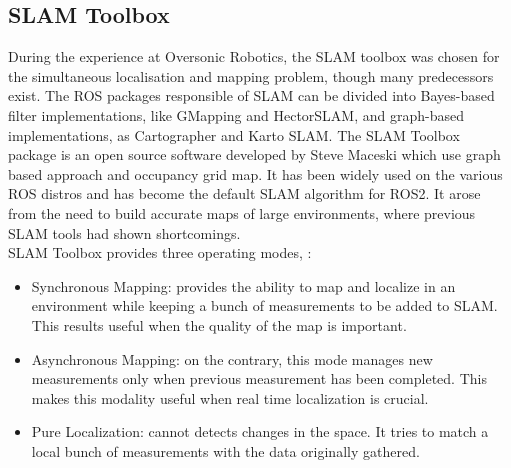 \subsection{SLAM Toolbox}
During the experience at Oversonic Robotics, the SLAM toolbox was chosen for the simultaneous localisation and mapping problem, though many predecessors exist.
The ROS packages responsible of SLAM can be divided into Bayes-based filter implementations, like GMapping and HectorSLAM, and graph-based implementations, as Cartographer and Karto SLAM.
The SLAM Toolbox package is an open source software developed by Steve Maceski which use graph based approach and occupancy grid map.
It has been widely used on the various ROS distros and has become the default SLAM algorithm for ROS2. It arose from the need to build accurate maps of large environments, where previous SLAM tools had shown shortcomings.\\
SLAM Toolbox provides three operating modes, \citet{Macenski2021}:
\begin{itemize}
    \item Synchronous Mapping: provides the ability to map and localize in an environment while keeping a bunch of measurements to be added to SLAM. This results useful when the quality of the map is important.
    \item Asynchronous Mapping: on the contrary, this mode manages new measurements only when previous measurement has been completed. This makes this modality useful when real time localization is crucial.
    \item Pure Localization: cannot detects changes in the space. It tries to match a local bunch of measurements with the data originally gathered.
\end{itemize}

